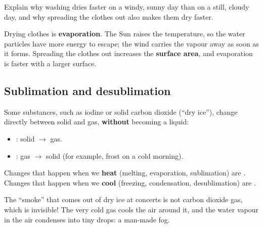 \begin{exercise}
    Explain why washing dries faster on a windy, sunny day than on a still, cloudy day, and why spreading the clothes out also makes them dry faster.
    \begin{solu}
        Drying clothes is \textbf{evaporation}. The Sun raises the temperature, so the water particles have more energy to escape; the wind carries the vapour away as soon as it forms. Spreading the clothes out increases the \textbf{surface area}, and evaporation is faster with a larger surface.
    \end{solu}
\end{exercise}

\subsection{Sublimation and desublimation}

Some substances, such as iodine or solid carbon dioxide (``dry ice''), change directly between solid and gas, \textbf{without} becoming a liquid:

\begin{itemize}
    \item {}: solid \(\to\) gas.
    \item {}: gas \(\to\) solid (for example, frost on a cold morning).
\end{itemize}

\begin{impt}
    Changes that happen when we \textbf{heat} (melting, evaporation, sublimation) are . Changes that happen when we \textbf{cool} (freezing, condensation, desublimation) are .
\end{impt}

\begin{didyouknow}
    The ``smoke'' that comes out of dry ice at concerts is not carbon dioxide gas, which is invisible! The very cold gas cools the air around it, and the water vapour in the air condenses into tiny drops: a man-made fog.
\end{didyouknow}

